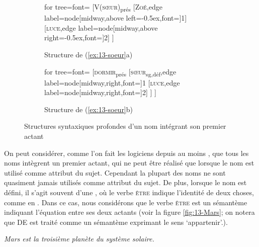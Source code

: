 \begin{figure}
	\begin{subfigure}[b]{0.5\textwidth}
		\centering
		\begin{forest} for tree={font=\normalfont}
			[V(\textsc{sœur})\textsubscript{prés}
				[\textsc{Zoé},edge label={node[midway,above left=-0.5ex,font=\footnotesize]{1}}]
				[\textsc{luce},edge label={node[midway,above right=-0.5ex,font=\footnotesize]{2}}]
			]
		\end{forest}
		\caption{Structure de (\ref{ex:13-soeur}a)}
	\end{subfigure}%
	\hfill
	\begin{subfigure}[b]{0.5\textwidth}
		\centering
		\begin{forest} for tree={font=\normalfont}
			[\textsc{dormir}\textsubscript{prés}
			[\textsc{sœur}\textsubscript{sg,déf},edge label={node[midway,right,font=\footnotesize]{1}}
			[\textsc{luce},edge label={node[midway,right,font=\footnotesize]{2}}]
			]
			]
		\end{forest}
		\caption{Structure de (\ref{ex:13-soeur}b)}
	\end{subfigure}
\caption{Structures syntaxiques profondes d’un nom intégrant son premier actant\label{fig:13-soeur-synt}}
\end{figure}

On peut considérer, comme l’on fait les logiciens depuis au moins \citet{frege1892uber}, que tous les noms intègrent un premier actant, qui ne peut être réalisé que lorsque le nom est utilisé comme attribut du sujet. Cependant la plupart des noms ne sont quasiment jamais utilisés comme attribut du sujet. De plus, lorsque le nom est défini, il s’agit souvent d’une , où le verbe \textsc{être} indique l’identité de deux choses, comme en . Dans ce cas, nous considérons que le verbe \textsc{être} est un sémantème indiquant l'équation entre ses deux actants (voir la figure \ref{fig:13-Mars}; on notera que DE est traité comme un sémantème exprimant le sens ‘appartenir’.).

\ea\label{ex:13-Mars} \textit{Mars est la troisième planète du système solaire.}\z

